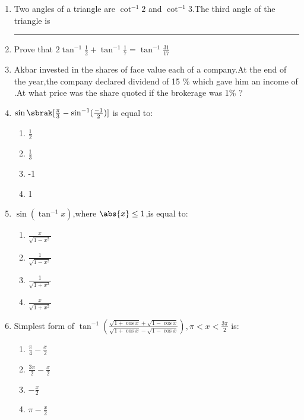  \begin{enumerate}
\item Two angles of a triangle are  $\cot^{-1}2$ and $\cot^{-1}3$.The third angle of the
triangle is \rule{30pt}{1pt}

\item Prove that $2\tan^{-1}\frac{1}{2} + \tan^{-1}\frac{1}{7} = \tan^{-1}\frac{31}{17}$

\item Akbar invested  in the shares of face value  each of a company.At the end of the year,the company declared dividend of 15 \% which gave him an income of .At what price was the share quoted if the brokerage was 1\% ?

\item $ \sin \sbrak[\frac{\pi}{3}-\sin^{-1}(\frac{-1}{2})] $ is equal to:

\begin{enumerate}

 \item $\frac{1}{2}$
 \item $\frac{1}{3}$
 \item -1
 \item 1

\end{enumerate}

\item $ \sin(\tan^{-1}x)$,where $\abs{x} \le 1 $,is equal to:

\begin{enumerate}

	\item$\frac{x}{\sqrt{1-x^2}}$
	\item$\frac{1}{\sqrt{1-x^2}}$ 
	\item$\frac{1}{\sqrt{1+x^2}}$
	\item$\frac{x}{\sqrt{1+x^2}}$

\end{enumerate}  

\item Simplest form of $ \tan^{-1}(\frac{\sqrt{1+\cos x}+\sqrt{1-\cos x}}{\sqrt{1+\cos x}- \sqrt {1- \cos x}}) , \pi < x < \frac{3\pi}{2}$ is:

\begin{enumerate}

  \item$\frac{\pi}{4} - \frac{x}{2}$
  \item$\frac{3\pi}{2} - \frac{x}{2}$
  \item$-\frac{x}{2}$
  \item${\pi} - \frac{x}{2}$

\end{enumerate}
\end{enumerate}
